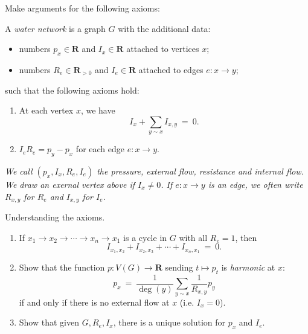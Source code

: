 \documentclass[11pt,fleqn]{book} %
\begin{document}
\begin{problem} 
    Make arguments for the following axioms:
   \begin{axiom}
    A \textit{water network} is a graph $G$ with the additional data: 
    \begin{itemize}
     \item  numbers $p_x\in \mathbf{R}$ and $I_x\in \mathbf{R}$ attached to vertices $x$;
     \item  numbers $R_{e}\in \mathbf{R}_{>0}$ and $I_{e}\in \mathbf{R}$ attached to edges $e:x\to y$;
    \end{itemize}
    such that the following axioms hold:
    \begin{enumerate}[label =\alph*.]
        \item At each vertex $x$, we have 
        $$I_x + \sum_{y\sim x}I_{x,y} \ = \ 0.$$
        \item $I_e R_e= p_y - p_x$ for each edge $e:x\to y$.
    \end{enumerate}
   \end{axiom}

\end{problem}


\textit{We call $(p_x,I_x,R_{e},I_{e})$ the \textit{pressure, external flow, resistance and internal flow}. We draw an exernal vertex above if $I_x \ne 0$. If $e:x\to y$ is an edge, we often write $R_{x,y}$ for $R_e$ and $I_{x,y}$ for $I_e$.}

\begin{problem}
  Understanding the axioms.
   \begin{enumerate}[label =\alph*.]
    \item If $x_1 \to x_2 \to \cdots \to x_n \to x_1$ is a cycle in $G$ with all $R_e=1$, then 
        $$I_{x_1,x_2}+ I_{x_2,x_3}+ \cdots + I_{x_n,x_1} \ = \ 0.$$
    \item Show that the function $p:V(G) \to \mathbf{R}$ sending $t\mapsto p_t$ is \textit{harmonic} at $x$:
    $$p_x \ = \ \frac{1}{\deg(y)}\sum_{y\sim x}\frac{1}{R_{x,y}}p_y$$
    if and only if there is no external flow at $x$ (i.e. $I_x=0$).
    \item Show that given $G, R_e,I_x$, there is a unique solution for $p_x$ and $I_e$.
   \end{enumerate} 
\end{problem}
\end{document}
